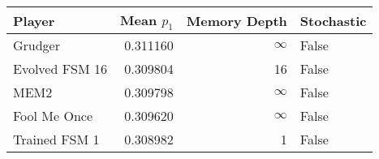 \begin{tabular}{lrrl}
\toprule
         Player &  Mean $p_1$ &  Memory Depth & Stochastic \\
\midrule
        Grudger &    0.311160 &            \(\infty\) &      False \\
 Evolved FSM 16 &    0.309804 &            16 &      False \\
           MEM2 &    0.309798 &            \(\infty\) &      False \\
   Fool Me Once &    0.309620 &            \(\infty\) &      False \\
  Trained FSM 1 &    0.308982 &             1 &      False \\
\bottomrule
\end{tabular}

